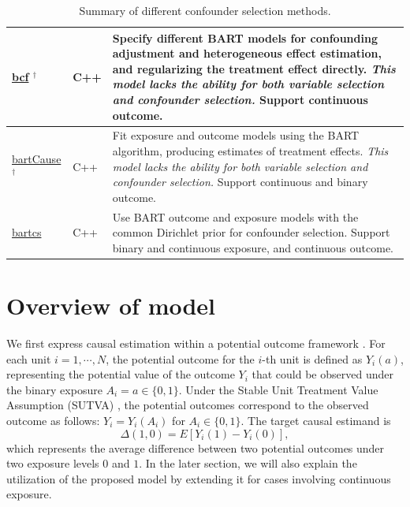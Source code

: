 \begin{table}[t!]
\begin{tabular}{p{4.9cm}lp{7.9cm}}
 \href{https://cran.r-project.org/package=bcf}{bcf} $^\dagger$  \citep{hahn2020bayesian}                      & C++       & 
Specify different BART models for confounding adjustment and heterogeneous effect estimation, and regularizing the treatment effect directly. \emph{This model lacks the ability for both variable selection and confounder selection.} Support continuous outcome.
                                           \\
                                           \hline
\href{https://cran.r-project.org/package=bartCause}{bartCause}$^\dagger$   \citep{bartcause}                      & C++       & Fit exposure and outcome models using the BART
algorithm, producing estimates of treatment effects. \emph{This model lacks the ability for both variable selection and confounder selection.} Support continuous and binary outcome.
                                           \\
                                           \hline
 \href{https://CRAN.R-project.org/package=bartcs}{bartcs}   \citep{bartcs}                      & C++      & Use BART outcome and exposure models with the common Dirichlet prior for confounder selection. Support binary and continuous exposure, and continuous outcome.
                                           \\
                                           \hline                                           
\end{tabular}
\caption{\label{tab:models}Summary of different confounder selection methods.}
\end{table}



\section{Overview of model}\label{sec:models}

We first express causal estimation within a potential outcome framework \citep{rubin1974estimating}. For each unit $i=1, \cdots, N$, the potential outcome for the $i$-th unit is defined as $Y_i(a)$, representing the potential value of the outcome $Y_i$ that could be observed under the binary exposure $A_i=a \in \{0,1\}$. Under the Stable Unit Treatment Value Assumption (SUTVA) \citep{rubin_discussion_1980}, the potential outcomes correspond to the observed outcome as follows:  $ Y_i = Y_i(A_i)$ for $A_i \in \{0, 1\} $. The target causal estimand is 
\[\Delta(1,0) = E[Y_i(1) - Y_i(0)],\]
which represents the average difference between two potential outcomes under two exposure levels $0$ and $1$. In the later section, we will also explain the utilization of the proposed model by extending it for cases involving continuous exposure.

